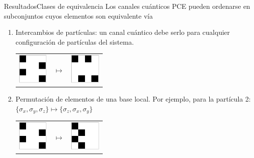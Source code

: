 \documentclass[xcolor=dvipsnames,presentation]{beamer}%
\begin{document}
\begin{frame}{Resultados}{Clases de equivalencia}
	Los canales cuánticos PCE pueden ordenarse en subconjuntos cuyos elementos
	son equivalente vía \vfill
	\begin{enumerate}
		\item Intercambios de partículas: un canal cuántico debe serlo para 
		cualquier configuración de partículas del sistema.
		\begin{center}
		\begin{tabular}{m{1.5cm} m{1.2cm} m{1.5cm}}
		\includegraphics[height=1.5cm]{2qubits_PCE_QC_001}
		& \hspace{\fill} \Large$\longmapsto$ \hspace{\fill}
		& \includegraphics[height=1.5cm]{2qubits_PCE_QC_003}
		\end{tabular}
		\end{center}\vfill 
		
		\item Permutación de elementos de una base local. Por ejemplo,\newline
		para la partícula 2: 
		$\{\sigma_x,\sigma_y,\sigma_z \}\mapsto \{\sigma_z,\sigma_x,\sigma_y \}$
		
		\begin{center}
		\begin{tabular}{m{1.5cm} m{1.2cm} m{1.5cm}}
		\includegraphics[height=1.5cm]{2qubits_PCE_QC_001}
		& \hspace{\fill} \Large$\longmapsto$ \hspace{\fill}
		& \includegraphics[height=1.5cm]{2qubits_PCE_QC_004}
		\end{tabular}
		\end{center}
	\end{enumerate}\vfill
\end{frame}
\end{document}
